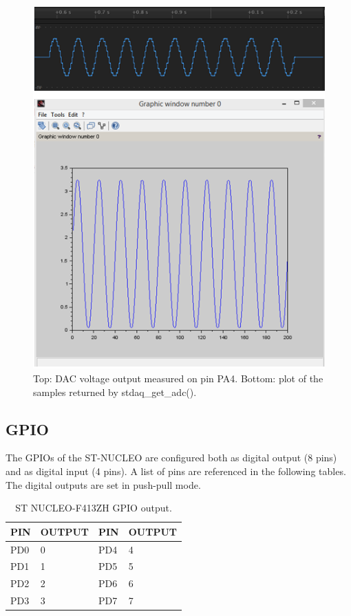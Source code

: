 \documentclass[letterpaper,10pt,english]{hitec}
\begin{document}
\begin{figure}[ht!]
\includegraphics[scale=0.8]{../img/adc_example.png}
\caption{Top: DAC voltage output measured on pin PA4. Bottom: plot of the samples returned by stdaq\_get\_adc().}
\label{fig:adc_example}
\end{figure}

\hrulefill
\newpage

\subsection{GPIO}

The GPIOs of the ST-NUCLEO are configured both as digital output (8 pins) and as digital input (4 pins). A list of pins are referenced in the following tables.
The digital outputs are set in push-pull mode.

\begin{table}[h]
\caption{ST NUCLEO-F413ZH GPIO output.}
\centering
\begin{tabular}{|ll|ll|}
 \textbf{PIN} & \textbf{OUTPUT} & \textbf{PIN} & \textbf{OUTPUT} \\ \hline
 PD0 & 0 & PD4 & 4 \\
 PD1 & 1 & PD5 & 5 \\
 PD2 & 2 & PD6 & 6 \\
 PD3 & 3 & PD7 & 7 
\end{tabular}
\end{table}
\end{document}
